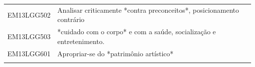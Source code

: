 \documentclass[12pt]{extarticle}
\begin{document}
\begin{longtable}{ll}
EM13LGG502 & Analisar criticamente *contra preconceitos*, posicionamento contrário                                                                                                                                                                                                                                                                                                                                                                                                                                                                                                                                                                                                                                                                                                                                                 \\
\rowcolor[HTML]{E0F7FA} 
EM13LGG503 & *cuidado com o corpo* e com a saúde, socialização e entretenimento.                                                                                                                                                                                                                                                                                                                                                                                                                                                                                                                                                                                                                                                                                                                                                   \\
\rowcolor[HTML]{FFF} 
EM13LGG601 & Apropriar-se do *patrimônio artístico*                                                                                                                                                                                                                                                                                                                                                                                                                                                                                                                                                                                                                                                                                                                                                                                \\
\rowcolor[HTML]{E0F7FA} 

\end{longtable}
\end{document}
